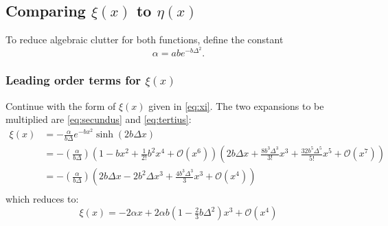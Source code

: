 \documentclass[10pt, oneside]{article}
\newcommand{\paren}[1]			{ \left(  #1 \right) }
\begin{document}
\subsection{Comparing $\xi\paren{x}$ to $\eta\paren{x}$}
To reduce algebraic clutter for both functions, define the constant
\begin{equation}
	\alpha = ab e^{-b\Delta^{2}}.
\end{equation}

\subsubsection{Leading order terms for $\xi(x)$}
Continue with the form of $\xi(x)$ given in \eqref{eq:xi}. The two expansions to be multiplied are \eqref{eq:secundus} and \eqref{eq:tertius}:
\begin{equation}
	\begin{split}
		\xi(x) &= -\frac{\alpha}{b\Delta}  e^{-bx^{2}}\sinh \paren{2b\Delta x}  \\
			&= 	-\paren{ \frac{\alpha} {b\Delta} }
				\paren{1 - bx^{2} + \frac{1}{2!}b^{2}x^{4} + \mathcal{O}\paren{x^{6}}}
				\paren{2b\Delta x + \frac{8b^{3}\Delta^{3}}{3!}x^{3}  + \frac{32b^{5}\Delta^{5}}{5!}x^{5} + \mathcal{O}\paren{x^{7}}} \\
			&=	-\paren{ \frac{\alpha} {b\Delta} } 
				\paren{2b\Delta x - 2b^{2}\Delta x^{3} + \frac{4b^{3}\Delta^{3}}{3}x^{3} + \mathcal{O}\paren{x^{4}}} \\
	\end{split}
\label{eq:argon}
\end{equation}
which reduces to:
\begin{equation}
	\boxed{
	\xi(x)  = -2 \alpha x + 2\alpha b \paren{1 - \tfrac{2}{3}b\Delta^{2}}x^{3} + \mathcal{O}\paren{x^{4}}
	}
\label{eq:xi-final}
\end{equation}
\end{document}
